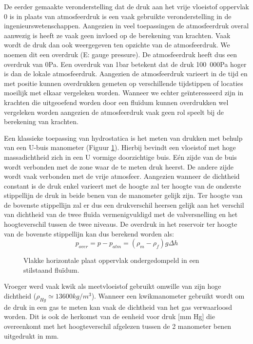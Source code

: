 De eerder gemaakte veronderstelling dat de druk aan het vrije vloeistof oppervlak 0 is in plaats van atmosfeerdruk is een vaak gebruikte veronderstelling in de ingenieurswetenschappen. Aangezien in veel toepassingen de atmosfeerdruk overal aanwezig is heeft ze vaak geen invloed op de berekening van krachten. Vaak wordt de druk dan ook weergegeven ten opzichte van de atmosfeerdruk. We noemen dit een overdruk (E: gauge pressure). De atmosfeerdruk heeft dus een overdruk van \unit{0}{Pa}. Een overdruk van \unit{1}{bar} betekent dat de druk \unit{100 000}{Pa} hoger is dan de lokale atmosfeerdruk. Aangezien de atmosfeerdruk varieert in de tijd en met positie kunnen overdrukken gemeten op verschillende tijdstippen of locaties moeilijk met elkaar vergeleken worden. Wanneer we echter geïnteresseerd zijn in krachten die uitgeoefend worden door een fluïdum kunnen overdrukken wel vergeleken worden aangezien de atmosfeerdruk vaak geen rol speelt bij de berekening van krachten.


Een klassieke toepassing van hydrostatica is het meten van drukken met behulp van een U-buis manometer (Figuur \ref{fig:Ubuis_manometer}). Hierbij bevindt een vloeistof met hoge massadichtheid zich in een U vormige doorzichtige buis. E\'en zijde van de buis wordt verbonden met de zone waar de te meten druk heerst. De andere zijde wordt vaak verbonden met de vrije atmosfeer. Aangezien wanneer de dichtheid constant is de druk enkel varieert met de hoogte zal ter hoogte van de onderste stippellijn de druk in beide benen van de manometer gelijk zijn. Ter hoogte van de bovenste stippellijn zal er dus een drukverschil heersen gelijk aan het verschil van dichtheid van de twee fluïda vermenigvuldigd met de valversnelling en het hoogteverschil tussen de twee niveaus. De overdruk in het reservoir ter hoogte van de bovenste stippellijn kan dus berekend worden als: 
\begin{equation}
	p_{over} = p-p_{atm} = (\rho_m-\rho_f) g \Delta h
\end{equation}
\begin{figure}[htb]
	\centering
	
	\caption{Vlakke horizontale plaat oppervlak ondergedompeld in een stilstaand fluïdum.}
	\label{fig:Ubuis_manometer}
\end{figure}
Vroeger werd vaak kwik als meetvloeistof gebruikt omwille van zijn hoge dichtheid ($\rho_{Hg} \simeq \unit{13600}{kg/m^3}$). Wanneer een kwikmanometer gebruikt wordt om de druk in een gas te meten kan vaak de dichtheid van het gas verwaarloosd worden. Dit is ook de herkomst van de eenheid voor druk [mm Hg] die overeenkomt met het hoogteverschil afgelezen tussen de 2 manometer benen uitgedrukt in mm.

